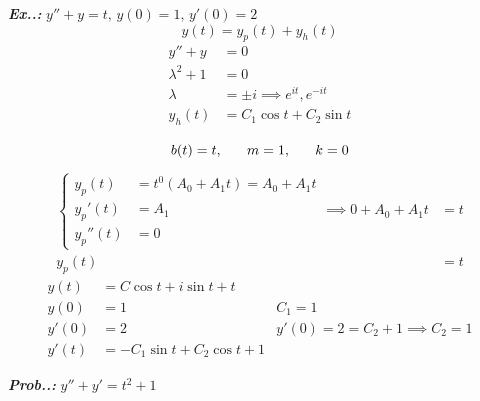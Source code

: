 \documentclass[a4paper]{article}
\begin{document}
\vspace{2ex}\textbf{\textit{Ex.\thesection.\theex: }}$y''+y=t,\,y(0)=1,\,y'(0)=2$
$$
y(t)=y_{p}(t)+y_{h}(t)
$$
\begin{align}
y''+y&=0 \\
\lambda^{2}+1&=0 \\
\lambda&=\pm i\implies e^{ it },e^{ -it } \\
y_{h}(t)&=C_{1}\cos t+C_{2}\sin t \\
\end{align}
$$
b(t)=t,\hspace{4ex}m=1,\hspace{4ex}k=0
$$
\begin{align}
\begin{cases}
y_{p}(t)&=t^{0}(A_{0}+A_{1}t)=A_{0}+A_{1}t \\
y_{p}'(t)&=A_{1} \\
y_{p}''(t)&=0
\end{cases}\implies 0+A_{0}+A_{1}t&=t \\
y_{p}(t)&=t
\end{align}
\begin{align}
y(t)&=C\cos t+i\sin t+t \\
y(0)&=1 & C_{1}=1\\
y'(0)&=2 & y'(0)=2=C_{2}+1\implies C_{2}=1\\
y'(t)&=-C_{1}\sin t+C_{2}\cos t+1
\end{align}

\vspace{2ex}\textbf{\textit{Prob.\thesection.\theprob: }}$y''+y'=t^{2}+1$
\end{document}
